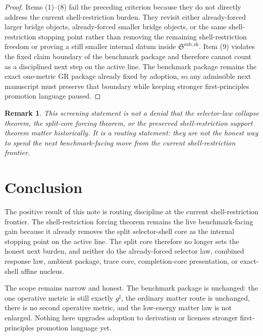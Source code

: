 \documentclass[11pt]{article}
\newcommand{\CompletedMetric}{g^{\sharp}}
\newcommand{\ShellRestriction}{\mathfrak S^{\mathrm{sub,sh}}}
\newtheorem{remark}{Remark}
\begin{document}
\begin{proof}
Items (1)--(8) fail the preceding criterion because they do not directly address the current shell-restriction burden. They revisit either already-forced larger bridge objects, already-forced smaller bridge objects, or the same shell-restriction stopping point rather than removing the remaining shell-restriction freedom or proving a still smaller internal datum inside \(\ShellRestriction\). Item (9) violates the fixed claim boundary of the benchmark package and therefore cannot count as a disciplined next step on the active line. The benchmark package remains the exact one-metric GR package already fixed by adoption, so any admissible next manuscript must preserve that boundary while keeping stronger first-principles promotion language paused.
\end{proof}

\begin{remark}
This screening statement is not a denial that the selector-law collapse theorem, the split-core forcing theorem, or the preserved shell-restriction support theorem matter historically. It is a routing statement: they are not the honest way to spend the next benchmark-facing move from the current shell-restriction frontier.
\end{remark}

\section{Conclusion}

The positive result of this note is routing discipline at the current shell-restriction frontier. The shell-restriction forcing theorem remains the live benchmark-facing gain because it already removes the split selector-shell core as the internal stopping point on the active line. The split core therefore no longer sets the honest next burden, and neither do the already-forced selector law, combined response law, ambient package, trace core, completion-core presentation, or exact-shell affine nucleus.

The scope remains narrow and honest. The benchmark package is unchanged: the one operative metric is still exactly \(\CompletedMetric\), the ordinary matter route is unchanged, there is no second operative metric, and the low-energy matter law is not enlarged. Nothing here upgrades adoption to derivation or licenses stronger first-principles promotion language yet.
\end{document}
